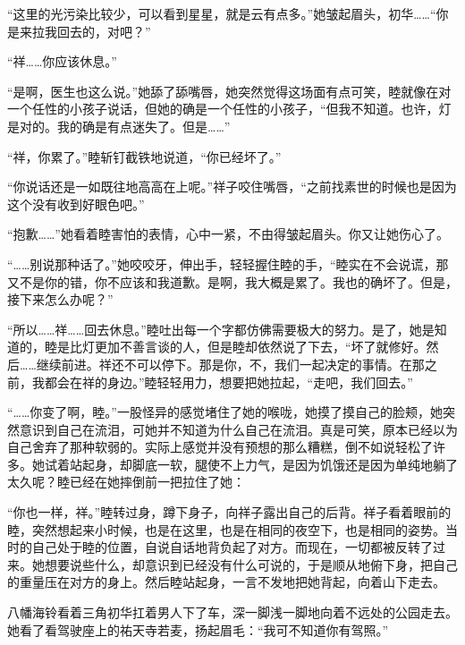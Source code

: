 \documentclass{article}
\begin{document}
“这里的光污染比较少，可以看到星星，就是云有点多。”她皱起眉头，初华……“你是来拉我回去的，对吧？”



“祥……你应该休息。”



“是啊，医生也这么说。”她舔了舔嘴唇，她突然觉得这场面有点可笑，睦就像在对一个任性的小孩子说话，但她的确是一个任性的小孩子，“但我不知道。也许，灯是对的。我的确是有点迷失了。但是……”



“祥，你累了。”睦斩钉截铁地说道，“你已经坏了。”



“你说话还是一如既往地高高在上呢。”祥子咬住嘴唇，“之前找素世的时候也是因为这个没有收到好眼色吧。”



“抱歉……”她看着睦害怕的表情，心中一紧，不由得皱起眉头。你又让她伤心了。



“……别说那种话了。”她咬咬牙，伸出手，轻轻握住睦的手，“睦实在不会说谎，那又不是你的错，你不应该和我道歉。是啊，我大概是累了。我也的确坏了。但是，接下来怎么办呢？”



“所以……祥……回去休息。”睦吐出每一个字都仿佛需要极大的努力。是了，她是知道的，睦是比灯更加不善言谈的人，但是睦却依然说了下去，“坏了就修好。然后……继续前进。祥还不可以停下。那是你，不，我们一起决定的事情。在那之前，我都会在祥的身边。”睦轻轻用力，想要把她拉起，“走吧，我们回去。”



“……你变了啊，睦。”一股怪异的感觉堵住了她的喉咙，她摸了摸自己的脸颊，她突然意识到自己在流泪，可她并不知道为什么自己在流泪。真是可笑，原本已经以为自己舍弃了那种软弱的。实际上感觉并没有预想的那么糟糕，倒不如说轻松了许多。她试着站起身，却脚底一软，腿使不上力气，是因为饥饿还是因为单纯地躺了太久呢？睦已经在她摔倒前一把拉住了她：



“你也一样，祥。”睦转过身，蹲下身子，向祥子露出自己的后背。祥子看着眼前的睦，突然想起来小时候，也是在这里，也是在相同的夜空下，也是相同的姿势。当时的自己处于睦的位置，自说自话地背负起了对方。而现在，一切都被反转了过来。她想要说些什么，却意识到已经没有什么可说的，于是顺从地俯下身，把自己的重量压在对方的身上。然后睦站起身，一言不发地把她背起，向着山下走去。



\newpage



八幡海铃看着三角初华扛着男人下了车，深一脚浅一脚地向着不远处的公园走去。她看了看驾驶座上的祐天寺若麦，扬起眉毛：“我可不知道你有驾照。”
\end{document}
